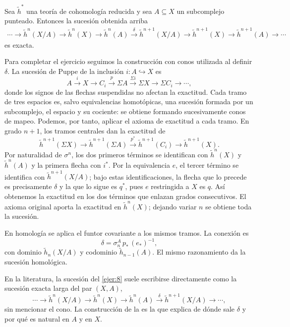 \begin{ejer}
Sea $\tilde h^*$ una teoría de cohomología reducida y sea $A\subseteq X$ un subcomplejo punteado. Entonces la sucesión obtenida arriba
\[
\begin{aligned}
\cdots\longrightarrow{}\tilde h^n(X/A)\longrightarrow\tilde h^n(X)\longrightarrow\tilde h^n(A)
\xrightarrow{\ \delta\ }\tilde h^{n+1}(X/A)\longrightarrow\tilde h^{n+1}(X)\longrightarrow\tilde h^{n+1}(A)\longrightarrow\cdots
\end{aligned}
\]
es exacta.
\end{ejer}

\begin{sol}
Para completar el ejercicio seguimos la construcción con conos utilizada al definir $\delta$. La sucesión de Puppe de la inclusión $i\colon A\hookrightarrow X$ es
\[
A\xrightarrow{i}X\longrightarrow C_i\xrightarrow{p}\Sigma A
\xrightarrow{\Sigma i}\Sigma X\longrightarrow\Sigma C_i\longrightarrow\cdots,
\]
donde los signos de las flechas suspendidas no afectan la exactitud. Cada tramo de tres espacios es, salvo equivalencias homotópicas, una sucesión formada por un subcomplejo, el espacio y su cociente: se obtiene formando sucesivamente conos de mapeo. Podemos, por tanto, aplicar el axioma de exactitud a cada tramo. En grado $n+1$, los tramos centrales dan la exactitud de
\[
\tilde h^{n+1}(\Sigma X)\longrightarrow\tilde h^{n+1}(\Sigma A)
\xrightarrow{p^*}\tilde h^{n+1}(C_i)\longrightarrow\tilde h^{n+1}(X).
\]
Por naturalidad de $\sigma^n$, los dos primeros términos se identifican con $\tilde h^n(X)$ y $\tilde h^n(A)$ y la primera flecha con $i^*$. Por la equivalencia $e$, el tercer término se identifica con $\tilde h^{n+1}(X/A)$; bajo estas identificaciones, la flecha que lo precede es precisamente $\delta$ y la que lo sigue es $q^*$, pues $e$ restringida a $X$ es $q$. Así obtenemos la exactitud en los dos términos que enlazan grados consecutivos. El axioma original aporta la exactitud en $\tilde h^n(X)$; dejando variar $n$ se obtiene toda la sucesión.

En homología se aplica el funtor covariante a los mismos tramos. La conexión es
\[
\delta=\sigma_n^A\,p_*\,(e_*)^{-1},
\]
 con dominio $\tilde h_n(X/A)$ y codominio $\tilde h_{n-1}(A)$. El mismo razonamiento da la sucesión homológica.
\end{sol}

\begin{nota}
   En la literatura, la sucesión del \cref{ejer:8} suele escribirse directamente como la sucesión exacta larga del par $(X,A)$,
   \[
   \cdots\to\tilde h^n(X/A)\to\tilde h^n(X)\to\tilde h^n(A)\xrightarrow{\delta}\tilde h^{n+1}(X/A)\to\cdots,
   \]
   sin mencionar el cono. La construcción de la  es la que explica de dónde sale $\delta$ y por qué es natural en $A$ y en $X$.
\end{nota}

